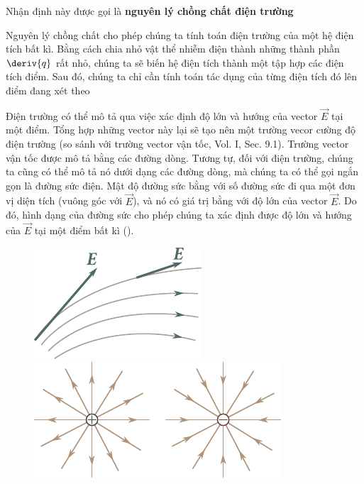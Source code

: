 \noindent
Nhận định này được gọi là \textbf{nguyên lý chồng chất điện trường}

Nguyên lý chồng chất cho phép chúng ta tính toán điện trường của một hệ điện tích bất kì. Bằng cách chia nhỏ vật thể nhiễm điện thành những thành phần $\deriv{q}$ rất nhỏ, chúng ta sẽ biến hệ điện tích thành một tập hợp các điện tích điểm. Sau đó, chúng ta chỉ cần tính toán tác dụng của từng điện tích đó lên điểm đang xét theo 

Điện trường có thể mô tả qua việc xác định độ lớn và hướng của vector $\vec{E}$ tại một điểm. Tổng hợp những vector này lại sẽ tạo nên một trường vecor cường độ điện trường (so sánh với trường vector vận tốc, Vol. I, Sec. 9.1). Trường vector vận tốc được mô tả bằng các đường dòng. Tương tự, đối với điện trường, chúng ta cũng có thể mô tả nó dưới dạng các đường dòng, mà chúng ta có thể gọi ngắn gọn là đường sức điện. Mật độ đường sức bằng với số đường sức đi qua một đơn vị diện tích (vuông góc với $\vec{E}$), và nó có giá trị bằng với độ lớn của vector $\vec{E}$. Do đó, hình dạng của đường sức cho phép chúng ta xác định được độ lớn và hướng của $\vec{E}$ tại một điểm bất kì ().

\begin{figure}[!htb]
	\begin{minipage}[t]{0.5\linewidth}
		\begin{center}
			\includegraphics[scale=1]{figures/ch_01/fig_1_5.pdf}
			\caption[]{}
			\label{fig:1_5}
		\end{center}
	\end{minipage}
	\hspace{-0.05cm}
	\begin{minipage}[t]{0.5\linewidth}
		\begin{center}
			\includegraphics[scale=1]{figures/ch_01/fig_1_6.pdf}
			\caption[]{}
			\label{fig:1_6}
		\end{center}
	\end{minipage}
\vspace{-0.4cm}
\end{figure}

